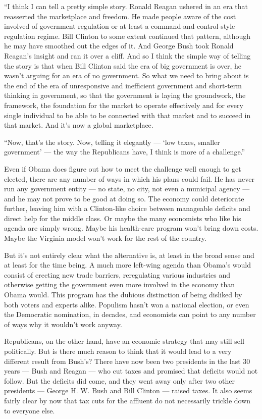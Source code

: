 ``I think I can tell a pretty simple story. Ronald Reagan ushered in an
era that reasserted the marketplace and freedom. He made people aware of
the cost involved of government regulation or at least a
command-and-control-style regulation regime. Bill Clinton to some extent
continued that pattern, although he may have smoothed out the edges of
it. And George Bush took Ronald Reagan's insight and ran it over a
cliff. And so I think the simple way of telling the story is that when
Bill Clinton said the era of big government is over, he wasn't arguing
for an era of no government. So what we need to bring about is the end
of the era of unresponsive and inefficient government and short-term
thinking in government, so that the government is laying the groundwork,
the framework, the foundation for the market to operate effectively and
for every single individual to be able to be connected with that market
and to succeed in that market. And it's now a global marketplace.

``Now, that's the story. Now, telling it elegantly --- `low taxes,
smaller government' --- the way the Republicans have, I think is more of
a challenge.''

Even if Obama does figure out how to meet the challenge well enough to
get elected, there are any number of ways in which his plans could fail.
He has never run any government entity --- no state, no city, not even a
municipal agency --- and he may not prove to be good at doing so. The
economy could deteriorate further, leaving him with a Clinton-like
choice between manageable deficits and direct help for the middle class.
Or maybe the many economists who like his agenda are simply wrong. Maybe
his health-care program won't bring down costs. Maybe the Virginia model
won't work for the rest of the country.

But it's not entirely clear what the alternative is, at least in the
broad sense and at least for the time being. A much more left-wing
agenda than Obama's would consist of erecting new trade barriers,
reregulating various industries and otherwise getting the government
even more involved in the economy than Obama would. This program has the
dubious distinction of being disliked by both voters and experts alike.
Populism hasn't won a national election, or even the Democratic
nomination, in decades, and economists can point to any number of ways
why it wouldn't work anyway.

Republicans, on the other hand, have an economic strategy that may still
sell politically. But is there much reason to think that it would lead
to a very different result from Bush's? There have now been two
presidents in the last 30 years --- Bush and Reagan --- who cut taxes
and promised that deficits would not follow. But the deficits did come,
and they went away only after two other presidents --- George H. W. Bush
and Bill Clinton --- raised taxes. It also seems fairly clear by now
that tax cuts for the affluent do not necessarily trickle down to
everyone else.

